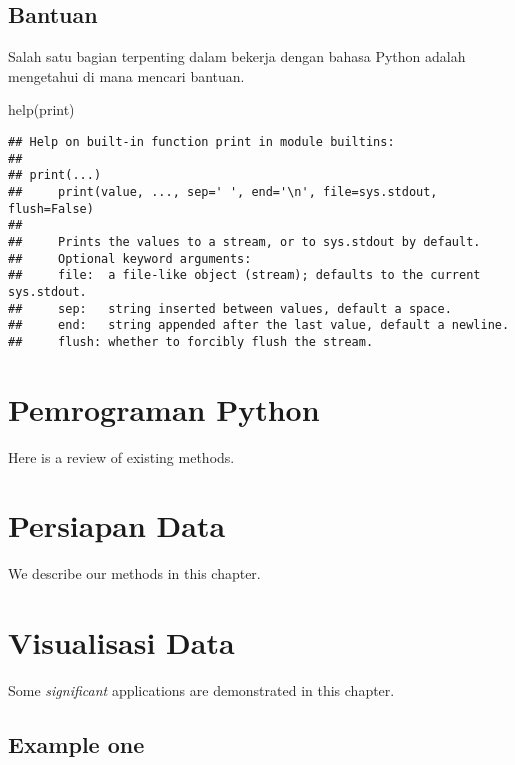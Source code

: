 \documentclass[
]{docs}
\newenvironment{Shaded}{\begin{snugshade}}{\end{snugshade}}
\newcommand{\BuiltInTok}[1]{#1}
\newcommand{\NormalTok}[1]{#1}
\begin{document}
\hypertarget{bantuan}{%
\subsection{Bantuan}\label{bantuan}}

Salah satu bagian terpenting dalam bekerja dengan bahasa Python adalah mengetahui di mana mencari bantuan.

\begin{Shaded}
\begin{Highlighting}[]
\BuiltInTok{help}\NormalTok{(}\BuiltInTok{print}\NormalTok{)}
\end{Highlighting}
\end{Shaded}

\begin{verbatim}
## Help on built-in function print in module builtins:
## 
## print(...)
##     print(value, ..., sep=' ', end='\n', file=sys.stdout, flush=False)
##     
##     Prints the values to a stream, or to sys.stdout by default.
##     Optional keyword arguments:
##     file:  a file-like object (stream); defaults to the current sys.stdout.
##     sep:   string inserted between values, default a space.
##     end:   string appended after the last value, default a newline.
##     flush: whether to forcibly flush the stream.
\end{verbatim}

\hypertarget{pemrograman-python}{%
\section{Pemrograman Python}\label{pemrograman-python}}

Here is a review of existing methods.

\hypertarget{persiapan-data}{%
\section{Persiapan Data}\label{persiapan-data}}

We describe our methods in this chapter.

\hypertarget{visualisasi-data}{%
\section{Visualisasi Data}\label{visualisasi-data}}

Some \emph{significant} applications are demonstrated in this chapter.

\hypertarget{example-one}{%
\subsection{Example one}\label{example-one}}
\end{document}
